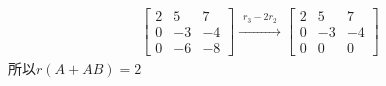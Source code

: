 \documentclass{article}
\begin{document}
\begin{jie}
\begin{align*}
{
\begin{bmatrix}
  2 & 5 & 7\\
  0& -3 & -4 \\
  0 & -6 & -8
\end{bmatrix}
}\xrightarrow{\substack{r_{3}-2 r_{2}}}
{
    \begin{bmatrix}
  2 & 5 & 7\\
  0& -3 & -4 \\
  0 & 0 & 0
\end{bmatrix}
}
\end{align*}
所以$r(A+AB)=2$
\end{jie}
\end{document}
